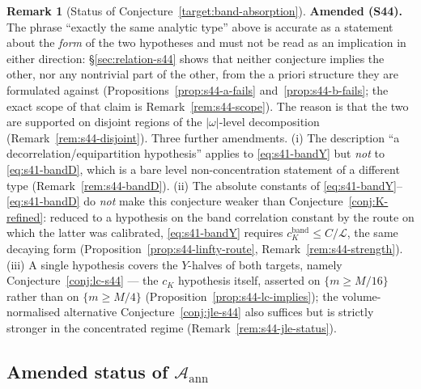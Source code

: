 \documentclass[11pt]{article}
\theoremstyle{definition}
\newtheorem{remark}[theorem]{Remark}
\theoremstyle{remark}
\begin{document}
\begin{remark}[Status of Conjecture~\ref{target:band-absorption}]
  \medskip
  \noindent\textbf{Amended (S44).} The phrase ``exactly the same analytic
  type'' above is accurate as a statement about the \emph{form} of the two
  hypotheses and must not be read as an implication in either direction:
  \S\ref{sec:relation-s44} shows that neither conjecture implies the other,
  nor any nontrivial part of the other, from the a priori structure they are
  formulated against (Propositions~\ref{prop:s44-a-fails}
  and~\ref{prop:s44-b-fails}; the exact scope of that claim is
  Remark~\ref{rem:s44-scope}). The reason is that the two are supported on
  disjoint regions of the $|\omega|$-level decomposition
  (Remark~\ref{rem:s44-disjoint}). Three further amendments. (i) The
  description ``a decorrelation/equipartition hypothesis'' applies to
  \eqref{eq:s41-bandY} but \emph{not} to \eqref{eq:s41-bandD}, which is a bare
  level non-concentration statement of a different type
  (Remark~\ref{rem:s44-bandD}). (ii) The absolute constants of
  \eqref{eq:s41-bandY}--\eqref{eq:s41-bandD} do \emph{not} make this
  conjecture weaker than Conjecture~\ref{conj:K-refined}: reduced to a
  hypothesis on the band correlation constant by the route on which the
  latter was calibrated, \eqref{eq:s41-bandY} requires
  $c_K^{\mathrm{band}}\leq C/\mathcal{L}$, the same decaying form
  (Proposition~\ref{prop:s44-linfty-route},
  Remark~\ref{rem:s44-strength}). (iii) A single hypothesis covers the
  $Y$-halves of both targets, namely Conjecture~\ref{conj:lc-s44} --- the
  $c_K$ hypothesis itself, asserted on $\{m\geq M/16\}$ rather than on
  $\{m\geq M/4\}$ (Proposition~\ref{prop:s44-lc-implies}); the
  volume-normalised alternative Conjecture~\ref{conj:jle-s44} also suffices
  but is strictly stronger in the concentrated regime
  (Remark~\ref{rem:s44-jle-status}).
\end{remark}

\subsection{Amended status of $\mathcal{A}_{\mathrm{ann}}$}
\label{subsec:s41-status}
\end{document}
